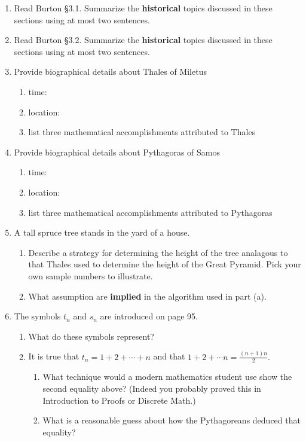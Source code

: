 \documentclass[12pt]{article}
\begin{document}
\begin{enumerate}
\item Read Burton \S 3.1. Summarize the \textbf{historical} topics discussed in these sections using at most two sentences.
\vspace{1in}
\item Read Burton \S 3.2. Summarize the \textbf{historical} topics discussed in these sections using at most two sentences.
\vspace{1in}
\item Provide biographical details about Thales of Miletus
	\begin{enumerate}
	\item time:
	\item location:
	\item list three mathematical accomplishments attributed to Thales
	\end{enumerate}
\vfill
\item Provide biographical details about Pythagoras of Samos
	\begin{enumerate}
	\item time:
	\item location:
	\item list three mathematical accomplishments attributed to Pythagoras
	\end{enumerate}
\vfill
\newpage
\item A tall spruce tree stands in the yard of a house. 
	\begin{enumerate}
	\item Describe a strategy for determining the height of the tree analagous to that Thales used to determine the height of the Great Pyramid. Pick your own sample numbers to illustrate.
	\vfill
	\item What assumption are \textbf{implied} in the algorithm used in part (a).
	\vfill
	\end{enumerate}
\item The symbols $t_n$ and $s_n$ are introduced on page 95.
	\begin{enumerate}
	\item What do these symbols represent?
	\vfill
	\item It is true that $t_n=1+2+\cdots+n$ and that $1+2+\cdots n=\frac{(n+1)n}{2}.$
		\begin{enumerate}
		\item What technique would a modern mathematics student use show the second equality above? (Indeed you probably proved this in Introduction to Proofs or Discrete Math.)
		\vfill
		\item What is a reasonable guess about how the Pythagoreans deduced that equality?
		\vfill
		\end{enumerate}
	\end{enumerate}
\end{enumerate}
\end{document}
